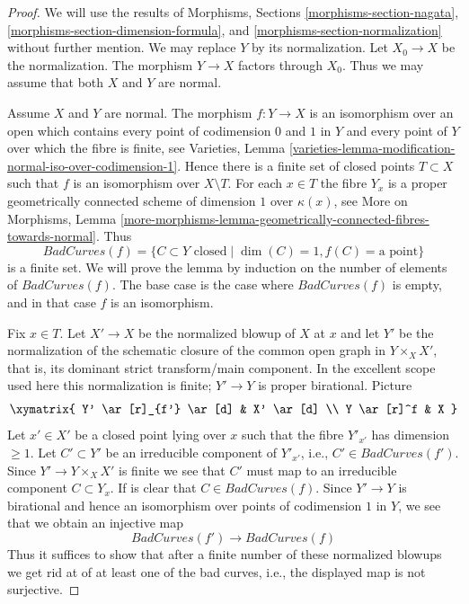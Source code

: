\begin{proof}
We will use the results of Morphisms, Sections
\ref{morphisms-section-nagata},
\ref{morphisms-section-dimension-formula}, and
\ref{morphisms-section-normalization} without further mention.
We may replace $Y$ by its normalization. Let $X_0 \to X$
be the normalization. The morphism $Y \to X$ factors through $X_0$.
Thus we may assume that both $X$ and $Y$ are normal.

\medskip\noindent
Assume $X$ and $Y$ are normal. The morphism $f : Y \to X$ is an isomorphism
over an open which contains every point of codimension $0$ and $1$ in $Y$ and
every point of $Y$ over which the fibre is finite, see Varieties, Lemma
\ref{varieties-lemma-modification-normal-iso-over-codimension-1}.
Hence there is a finite set of closed points $T \subset X$
such that $f$ is an isomorphism over $X \setminus T$. For each $x \in T$
the fibre $Y_x$ is a proper geometrically connected scheme of dimension $1$
over $\kappa(x)$, see
More on Morphisms, Lemma
\ref{more-morphisms-lemma-geometrically-connected-fibres-towards-normal}.
Thus
$$
BadCurves(f) = \{C \subset Y\text{ closed} \mid
\dim(C) = 1, f(C) = \text{a point}\}
$$
is a finite set. We will prove the lemma by induction on the number
of elements of $BadCurves(f)$. The base case is the case where $BadCurves(f)$
is empty, and in that case $f$ is an isomorphism.

\medskip\noindent
Fix $x \in T$. Let $X' \to X$ be the normalized blowup of $X$ at $x$ and let
$Y'$ be the normalization of the schematic closure of the common
open graph in $Y \times_X X'$, that is, its dominant strict
transform/main component. In the excellent scope used here this
normalization is finite; $Y' \to Y$ is proper birational. Picture
$$
\xymatrix{
Y' \ar[r]_{f'} \ar[d] & X' \ar[d] \\
Y \ar[r]^f & X
}
$$
Let $x' \in X'$ be a closed point lying over $x$ such that
the fibre $Y'_{x'}$ has dimension $\geq 1$. Let $C' \subset Y'$
be an irreducible component of $Y'_{x'}$, i.e., $C' \in BadCurves(f')$.
Since $Y' \to Y \times_X X'$ is finite we see that $C'$ must map
to an irreducible component $C \subset Y_x$.
If is clear that $C \in BadCurves(f)$.
Since $Y' \to Y$ is birational and hence an isomorphism over points of
codimension $1$ in $Y$, we see that we obtain an injective map
$$
BadCurves(f') \longrightarrow BadCurves(f)
$$
Thus it suffices to show that after a finite number of these
normalized blowups we get rid at of at least one of the bad
curves, i.e., the displayed map is not surjective.


\end{proof}
